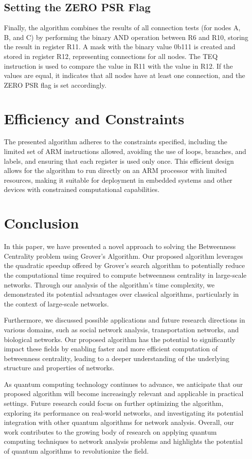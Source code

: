 \subsection{Setting the ZERO PSR Flag}
Finally, the algorithm combines the results of all connection tests (for nodes A, B, and C) by performing the binary AND operation between R6 and R10, storing the result in register R11. A mask with the binary value 0b111 is created and stored in register R12, representing connections for all nodes. The TEQ instruction is used to compare the value in R11 with the value in R12. If the values are equal, it indicates that all nodes have at least one connection, and the ZERO PSR flag is set accordingly.

\section{Efficiency and Constraints}
The presented algorithm adheres to the constraints specified, including the limited set of ARM instructions allowed, avoiding the use of loops, branches, and labels, and ensuring that each register is used only once. This efficient design allows for the algorithm to run directly on an ARM processor with limited resources, making it suitable for deployment in embedded systems and other devices with constrained computational capabilities.

\section{Conclusion}

In this paper, we have presented a novel approach to solving the Betweenness Centrality problem using Grover's Algorithm. Our proposed algorithm leverages the quadratic speedup offered by Grover's search algorithm to potentially reduce the computational time required to compute betweenness centrality in large-scale networks. Through our analysis of the algorithm's time complexity, we demonstrated its potential advantages over classical algorithms, particularly in the context of large-scale networks.

Furthermore, we discussed possible applications and future research directions in various domains, such as social network analysis, transportation networks, and biological networks. Our proposed algorithm has the potential to significantly impact these fields by enabling faster and more efficient computation of betweenness centrality, leading to a deeper understanding of the underlying structure and properties of networks.

As quantum computing technology continues to advance, we anticipate that our proposed algorithm will become increasingly relevant and applicable in practical settings. Future research could focus on further optimizing the algorithm, exploring its performance on real-world networks, and investigating its potential integration with other quantum algorithms for network analysis. Overall, our work contributes to the growing body of research on applying quantum computing techniques to network analysis problems and highlights the potential of quantum algorithms to revolutionize the field.

